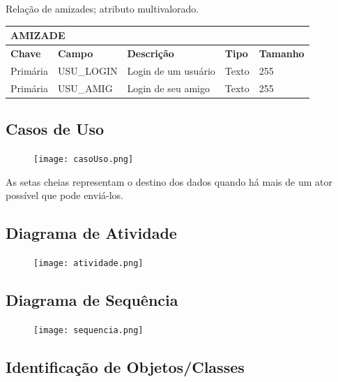 \documentclass[paper=a4, fontsize=11pt]{scrartcl}	%
\numberwithin{equation}{section}															%
\numberwithin{figure}{section}																%
\numberwithin{table}{section}																%
\begin{document}
\subsubsection{} Relação de amizades; atributo multivalorado.

\begin{center}
\begin{tabular}{ l  l  l  l l }
  \multicolumn{5}{l}{\textbf{AMIZADE}} \\
  \hline
  \textbf{Chave} & \textbf{Campo} & \textbf{Descrição} & \textbf{Tipo} & \textbf{Tamanho} \\
  \cline{1-5}
  Primária & USU\_LOGIN & Login de um usuário & Texto & 255 \\
  Primária & USU\_AMIG & Login de seu amigo & Texto & 255
\end{tabular}
\end{center}

\newpage
\subsection{Casos de Uso}

\begin{figure}[h!]
	\centerline{
	\texttt{[image: casoUso.png]}
	}
\end{figure}

As setas cheias representam o destino dos dados quando há mais de um ator possível que pode enviá-los.

\begin{landscape}
\newpage
\subsection{Diagrama de Atividade}

\begin{figure}[h!]
	\centerline{
	\texttt{[image: atividade.png]}
	}
\end{figure}

\end{landscape}

\newpage
\subsection{Diagrama de Sequência}

\begin{figure}[h!]
	\centerline{
	\texttt{[image: sequencia.png]}
	}
\end{figure}

\newpage
\subsection{Identificação de Objetos/Classes}
\end{document}
